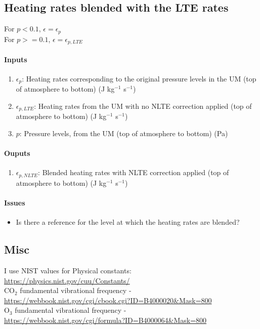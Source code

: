 \subsection{Heating rates blended with the LTE rates}

   For $p < 0.1$, $\epsilon = \epsilon_p$ \\
   For $p >= 0.1$, $\epsilon = \epsilon_{p,LTE}$

   \paragraph{Inputs}
   \begin{enumerate}
   \item $\epsilon_p$: Heating rates corresponding to the original pressure 
     levels in the UM (top of atmosphere to bottom) (J kg$^{-1}$ s$^{-1}$)
   \item $\epsilon_{p,LTE}$: Heating rates from the UM with no NLTE 
     correction applied (top of atmosphere to bottom) (J kg$^{-1}$ s$^{-1}$) 
   \item $p$: Pressure levels, from the UM (top of atmosphere to bottom)
     (Pa)
   \end{enumerate}

   \paragraph{Ouputs}
   \begin{enumerate}
   \item $\epsilon_{p,NLTE}$: Blended heating rates with NLTE correction 
     applied (top of atmosphere to bottom) (J kg$^{-1}$ s$^{-1}$)
   \end{enumerate}

   \paragraph{Issues}
   \begin{itemize}
   \item Is there a reference for the level at which the heating rates are 
     blended?
   \end{itemize}



\subsection{Misc}

I use NIST values for Physical constants: \\
\url{https://physics.nist.gov/cuu/Constants/} \\ 
CO$_2$ fundamental vibrational frequency - \\
    \url{https://webbook.nist.gov/cgi/cbook.cgi?ID=B4000020&Mask=800} \\
O$_3$ fundamental vibrational frequency - \\
   \url{https://webbook.nist.gov/cgi/formula?ID=B4000064&Mask=800}


